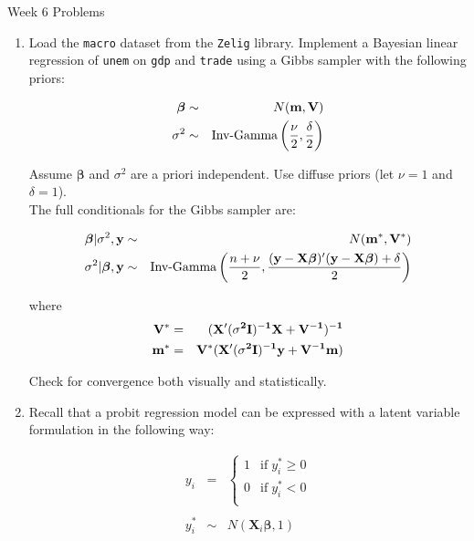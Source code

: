 \documentclass[10pt,a4paper]{article}
\author{Patrick Lam}
\begin{document}
\begin{center}
\begin{Large}Week 6 Problems\end{Large}
\end{center}
\bigskip
\begin{enumerate}

\item Load the {\tt macro} dataset from the {\tt Zelig} library.  Implement a Bayesian linear regression of {\tt unem} on {\tt gdp} and {\tt trade} using a Gibbs sampler with the following priors:

\begin{eqnarray*}
\bm{\beta} &\sim& N(\bf{m}, \bf{V}) \\
\sigma^2 &\sim& \text{Inv-Gamma}\left(\frac{\nu}{2}, \frac{\delta}{2}\right)
\end{eqnarray*}

Assume $\bm{\beta}$ and $\sigma^2$ are a priori independent. Use diffuse priors (let $\nu=1$ and $\delta=1$).\\

The full conditionals for the Gibbs sampler are:

\begin{eqnarray*}
\bm{\beta} | \sigma^2, \bf{y} &\sim& N(\bf{m^*}, \bf{V^*}) \\
\sigma^2 | \bm{\beta}, \bf{y} &\sim& \text{Inv-Gamma}\left(\frac{n+\nu}{2}, \frac{(\bf{y} - \bm{X\beta})' (\bf{y} - \bm{X\beta}) + \delta}{2} \right)
\end{eqnarray*}

where
\begin{eqnarray*}
\bf{V^*} &=& (\bf{X}' (\sigma^2 \bm{I})^{-1} \bf{X} + \bm{V}^{-1})^{-1} \\
\bf{m^*} &=& \bf{V^*} (\bm{X}' (\sigma^2 \bm{I})^{-1} \bf{y} + \bm{V}^{-1} \bf{m})
\end{eqnarray*}

Check for convergence both visually and statistically.  

\bigskip 

\item Recall that a probit regression model can be expressed with a latent variable formulation in the following way:

\begin{eqnarray*}
y_i &=& \left \lbrace \begin{matrix} 1 & \text{if} \; y_i^* \ge 0\\
0 & \text{if} \; y_i^* < 0 \\ \end{matrix} \right. \\\\
y_i^* &\sim& N(\mathbf{X}_i \bm{\beta}, 1)
\end{eqnarray*}


\end{enumerate}
\end{document}
